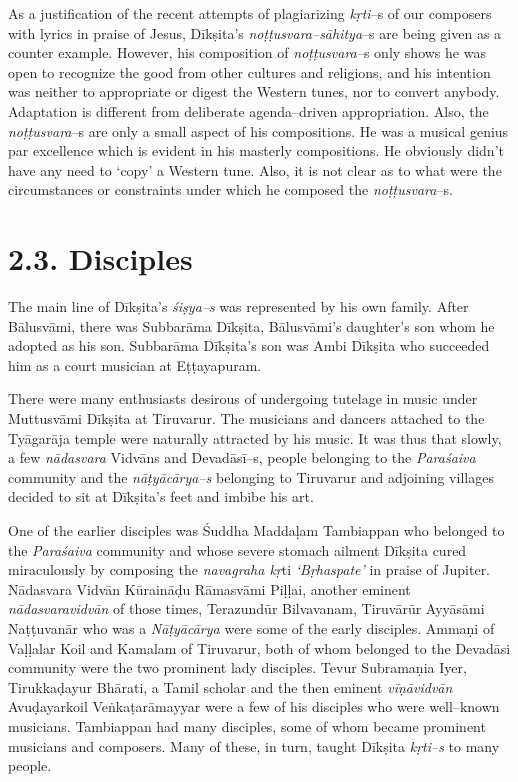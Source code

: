 As a justification of the recent attempts of plagiarizing \textit{kṛti}–s of our composers with lyrics in praise of Jesus, Dīkṣita’s \textit{noṭṭusvara–sāhitya}–s are being given as a counter example\supskpt{\ref{999–aside.xhtmlid–c1–en1}}. However, his composition of \textit{noṭṭusvara–}s only shows he was open to recognize the good from other cultures and religions, and his intention was neither to appropriate or digest the Western tunes, nor to convert anybody. Adaptation is different from deliberate agenda–driven appropriation. Also, the \textit{noṭṭusvara}–s are only a small aspect of his compositions. He was a musical genius par excellence which is evident in his masterly compositions. He obviously didn’t have any need to ‘copy’ a Western tune. Also, it is not clear as to what were the circumstances or constraints under which he composed the \textit{noṭṭusvara}–s.



\section*{2.3. Disciples}

The main line of Dīkṣita’s \textit{śiṣya–s} was represented by his own family. After Bālusvāmi, there was Subbarāma Dīkṣita, Bālusvāmi’s daughter’s son whom he adopted as his son. Subbarāma Dīkṣita’s son was Ambi Dīkṣita who succeeded him as a court musician at Eṭṭayapuram.

There were many enthusiasts desirous of undergoing tutelage in music under Muttusvāmi Dīkṣita at Tiruvarur. The musicians and dancers attached to the Tyāgarāja temple were naturally attracted by his music. It was thus that slowly, a few \textit{nādasvara} Vidvāns and Devadāsī–s, people belonging to the \textit{Paraśaiva} community and the \textit{nāṭyācārya–s} belonging to Tiruvarur and adjoining villages decided to sit at Dīkṣita's feet and imbibe his art.

One of the earlier disciples was Śuddha Maddaḷam Tambiappan who belonged to the \textit{Paraśaiva} community and whose severe stomach ailment Dīkṣita cured miraculously by composing the \textit{navagraha kṛ}ti\textit{ ‘Bṛhaspate’} in praise of Jupiter. Nādasvara Vidvān Kūraināḍu Rāmasvāmi Piḷḷai, another eminent \textit{nādasvaravidvān} of those times, Terazundūr Bilvavanam, Tiruvārūr Ayyāsāmi Naṭṭuvanār who was a \textit{Nāṭyācārya} were some of the early disciples. Ammaṇi of Vaḷḷalar Koil and Kamalam of Tiruvarur, both of whom belonged to the Devadāsi community were the two prominent lady disciples. Tevur Subramaṇia Iyer, Tirukkaḍayur Bhārati, a Tamil scholar and the then eminent \textit{vīṇāvidvān} Avuḍayarkoil Veṅkaṭarāmayyar were a few of his disciples who were well–known musicians. Tambiappan had many disciples, some of whom became prominent musicians and composers. Many of these, in turn, taught Dīkṣita \textit{kṛti–s} to many people.

